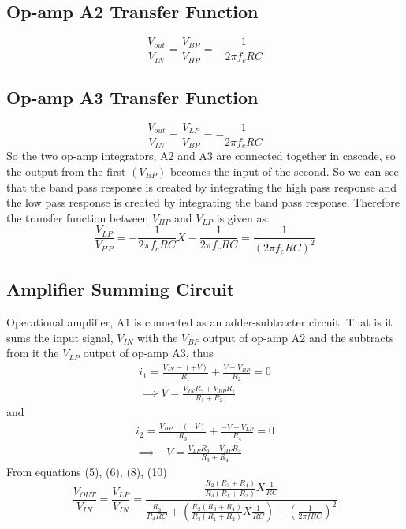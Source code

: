 \documentclass[
	letterpaper, %
	10pt, %
]{CSUniSchoolLabReport}
\begin{document}
\subsection{Op-amp A2 Transfer Function} 
\begin{equation}
	\frac{V_{out} }{V_{IN} } = \frac{V_{BP} }{V_{HP} } = -\frac{1}{2 \pi f_c RC} 
\end{equation}
\subsection{Op-amp A3 Transfer Function} 

\begin{equation}
	\frac{V_{out} }{V_{IN} } = \frac{V_{LP} }{V_{BP} } = -\frac{1}{2 \pi f_c RC} 
\end{equation}
So the two op-amp integrators, A2 and A3 are connected together in cascade, so the output from the first $(V_{BP})$ becomes the input of the second. So we can see that the band pass response is created by integrating the high pass response and the low pass response is created by integrating the band pass response. Therefore the transfer function between $V_{HP}$ and $V_{LP}$ is given as:
\begin{equation}
	\frac{V_{LP} }{V_{HP} } = -\frac{1}{2 \pi f_c RC} X -\frac{1}{2 \pi f_c RC} =\frac{1}{(2 \pi f_c RC)^2}   
\end{equation}
\subsection{Amplifier Summing Circuit}
 
Operational amplifier, A1 is connected as an adder-subtracter circuit. That is it sums the input signal, $V_{IN}$ with the $V_{BP}$ output of op-amp A2 and the subtracts from it the $V_{LP}$ output of op-amp A3, thus 
\begin{gather}
	i_1 = \frac{V_{IN}-(+V) }{R_1}+\frac{V-V_{BP} }{R_2} = 0\\
	\implies V = \frac{V_{IN}R_2 + V_{BP}R_1 }{R_1 + R_2}
\end{gather}
and 
\begin{gather}
	i_2 = \frac{V_{HP}-(-V) }{R_3}+\frac{-V-V_{LP} }{R_4} = 0\\
	\implies -V = \frac{V_{LP}R_{3}  + V_{HP}R_4 }{R_3 + R_4}
\end{gather}
From equations (5), (6), (8), (10)
\begin{equation}
	\boxed{\frac{V_{OUT}}{V_{IN}} = \frac{V_{LP} }{V_{IN} } = \frac{\frac{R_2(R_3 + R_4)}{R_3(R_1 + R_2)}X\frac{1}{RC}}{\frac{R_3}{R_4 R C}+\left(\frac{R_2(R_3 + R_4)}{R_3(R_1 + R_2)}X\frac{1}{RC}\right)+\left(\frac{1}{2 \pi f RC}\right)^2}}
\end{equation}
\end{document}
